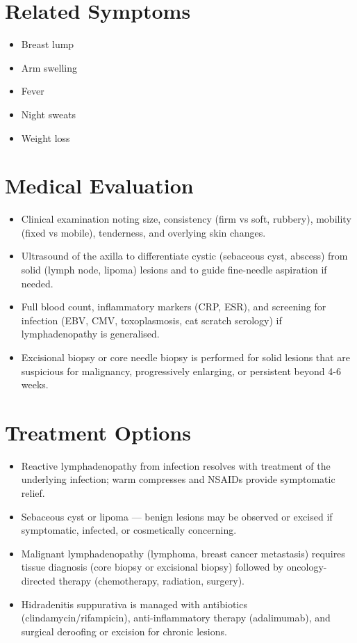 \section*{Related Symptoms}
\begin{itemize}
  \item Breast lump
  \item Arm swelling
  \item Fever
  \item Night sweats
  \item Weight loss
\end{itemize}

\section*{Medical Evaluation}
\begin{itemize}
  \item Clinical examination noting size, consistency (firm vs soft, rubbery), mobility (fixed vs mobile), tenderness, and overlying skin changes.
  \item Ultrasound of the axilla to differentiate cystic (sebaceous cyst, abscess) from solid (lymph node, lipoma) lesions and to guide fine-needle aspiration if needed.
  \item Full blood count, inflammatory markers (CRP, ESR), and screening for infection (EBV, CMV, toxoplasmosis, cat scratch serology) if lymphadenopathy is generalised.
  \item Excisional biopsy or core needle biopsy is performed for solid lesions that are suspicious for malignancy, progressively enlarging, or persistent beyond 4-6 weeks.
\end{itemize}

\section*{Treatment Options}
\begin{itemize}
  \item Reactive lymphadenopathy from infection resolves with treatment of the underlying infection; warm compresses and NSAIDs provide symptomatic relief.
  \item Sebaceous cyst or lipoma — benign lesions may be observed or excised if symptomatic, infected, or cosmetically concerning.
  \item Malignant lymphadenopathy (lymphoma, breast cancer metastasis) requires tissue diagnosis (core biopsy or excisional biopsy) followed by oncology-directed therapy (chemotherapy, radiation, surgery).
  \item Hidradenitis suppurativa is managed with antibiotics (clindamycin/rifampicin), anti-inflammatory therapy (adalimumab), and surgical deroofing or excision for chronic lesions.
\end{itemize}

